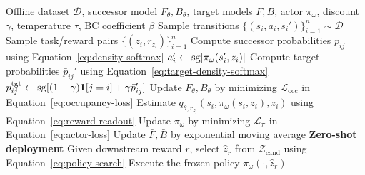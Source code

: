 \begin{algorithm}[t]
\caption{\name{}}
\label{alg:dfb}
\begin{algorithmic}[1]
\Require Offline dataset $\mathcal D$, successor model $F_\theta,B_\theta$, target models $\bar F,\bar B$, actor $\pi_\omega$, discount $\gamma$, temperature $\tau$, BC coefficient $\beta$
    \State Sample transitions $\{(s_i,a_i,s_i')\}_{i=1}^{n}\sim\mathcal D$
    \State Sample task/reward pairs $\{(z_i,r_{z_i})\}_{i=1}^{n}$
    \State Compute successor probabilities $p_{ij}$ using Equation~\eqref{eq:density-softmax}
    \State $a_i'\gets\mathrm{sg}[\pi_\omega(s_i',z_i)]$
    \State Compute target probabilities $\bar p_{ij}'$ using Equation~\eqref{eq:target-density-softmax}
    \State $p_{ij}^{\mathrm{tgt}}\gets\mathrm{sg}[(1-\gamma)\mathbf 1[j=i]+\gamma\bar p_{ij}']$
    \State Update $F_\theta,B_\theta$ by minimizing $\mathcal L_{\mathrm{occ}}$ in Equation~\eqref{eq:occupancy-loss}
    \State Estimate $q_{\theta,r_{z_i}}(s_i,\pi_\omega(s_i,z_i),z_i)$ using Equation~\eqref{eq:reward-readout}
    \State Update $\pi_\omega$ by minimizing $\mathcal L_\pi$ in Equation~\eqref{eq:actor-loss}
    \State Update $\bar F,\bar B$ by exponential moving average
\EndFor
\Statex
\Statex \textbf{Zero-shot deployment}
\State Given downstream reward $r$, select $\hat z_r$ from $\mathcal Z_{\mathrm{cand}}$ using Equation~\eqref{eq:policy-search}
\State Execute the frozen policy $\pi_\omega(\cdot,\hat z_r)$
\end{algorithmic}
\end{algorithm}